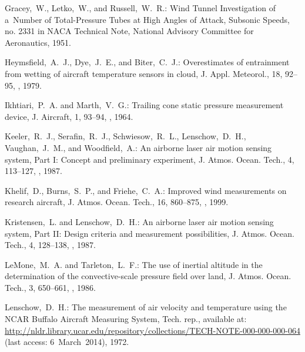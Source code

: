 \documentclass[amtd, online, hvmath]{copernicus}
\begin{document}
\begin{thebibliography}{30}
Gracey,~W., Letko,~W., and Russell,~W.~R.: {Wind Tunnel Investigation of a~Number
 of Total-Pressure Tubes at High Angles of Attack, Subsonic Speeds}, no. 2331
 in {NACA Technical Note}, National Advisory Committee for Aeronautics, 1951.


Heymsfield,~A.~J., Dye,~J.~E., and Biter,~C.~J.: {Overestimates of entrainment
from wetting of aircraft temperature sensors in cloud}, J. Appl. Meteorol., 18,
92--95, , 1979.


Ikhtiari,~P.~A. and Marth,~V.~G.: {Trailing cone static pressure measurement device}, {J. Aircraft}, 1, 93--94, , 1964.


Keeler,~R.~J., Serafin,~R.~J., Schwiesow,~R.~L., Lenschow,~D.~H., Vaughan,~J.~M.,
and Woodfield,~A.: {An airborne laser air motion sensing system, Part I: Concept
and preliminary experiment}, {J. Atmos. Ocean. Tech.}, 4, 113--127, , 1987.


Khelif,~D., Burns,~S.~P., and Friehe,~C.~A.: {Improved wind measurements on
research aircraft}, {J. Atmos. Ocean. Tech.}, {16}, {860--875}, , {1999}.


Kristensen,~L. and Lenschow,~D.~H.: {An airborne laser air motion sensing system,
Part II: Design criteria and measurement possibilities}, {J. Atmos. Ocean. Tech.}, 4, 128--138, , 1987.


LeMone,~M.~A. and Tarleton,~L.~F.: {The use of inertial altitude in the determination
of the convective-scale pressure field over land}, {J. Atmos. Ocean. Tech.}, {3}, {650--661}, , {1986}.


Lenschow,~D.~H.: {The measurement of air velocity and temperature
  using the NCAR Buffalo Aircraft Measuring System}, Tech. rep.,
available at: \url{http://nldr.library.ucar.edu/repository/collections/TECH-NOTE-000-000-000-064} (last access: 6~March~2014),
1972.



\end{thebibliography}
\end{document}
